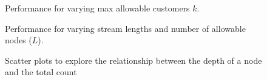 \begin{figure}[t] 
	\begin{center}
		\caption{Performance for varying max allowable customers $k$.}
		\label{fig: varying_max_customers}
	\end{center} 
\end{figure} 

\begin{figure}[t] 
	\begin{center}
		\caption{Performance for varying stream lengths and number of allowable nodes ($L$).}
		\label{fig:varying_stream_length}
	\end{center} 
\end{figure} 

\begin{figure}[t] 
	\begin{center}
		\caption{Scatter plots to explore the relationship between the depth of a node and the total count}
		\label{fig:restaurant_plots}
	\end{center} 
\end{figure} 
